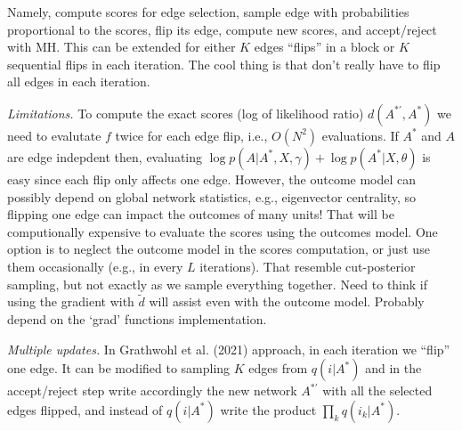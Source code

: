 \documentclass[12pt]{article}
\begin{document}
\begin{enumerate}
            Namely, compute scores for edge selection, sample edge with probabilities
            proportional to the scores, flip its edge, compute new scores,
             and accept/reject with MH. 
             This can be extended for either $K$ edges ``flips'' in a block 
             or $K$ sequential flips in each iteration. 
             The cool thing is that don't really have to flip all edges
             in each iteration.

            \textit{Limitations.} To compute the exact scores (log of likelihood ratio) $d(A^{\ast'},A^\ast)$ 
            we need to evalutate $f$ twice for each edge flip, i.e., $O(N^2)$ evaluations.
            If $A^\ast$ and $A$ are edge indepdent then, evaluating 
            $\log p(A \vert A^\ast, X,\gamma) + \log p(A^\ast \vert X,\theta)$ is easy
            since each flip only affects one edge. 
            However, the outcome model can possibly depend on global network statistics,
            e.g., eigenvector centrality, so flipping one edge can impact the outcomes of many units!
            That will be computionally expensive to evaluate the scores using the outcomes model.
            One option is to neglect the outcome model in the scores computation, 
            or just use them occasionally (e.g., in every $L$ iterations). 
            That resemble cut-posterior sampling, but not exactly as we sample everything together.
            Need to think if using the gradient with $\widetilde{d}$ will assist even with the outcome model.
            Probably depend on the `grad' functions implementation.

            \textit{Multiple updates.} In Grathwohl et al. (2021) approach, in each iteration we ``flip'' one edge.
            It can be modified to sampling $K$ edges from $q(i\vert A^\ast)$ and
            in the accept/reject step write accordingly the new network $A^{\ast'}$ 
            with all the selected edges flipped, and instead of $q(i \vert A^\ast)$ write
            the product $\prod_k q(i_k \vert A^\ast)$.


\end{enumerate}
\end{document}
